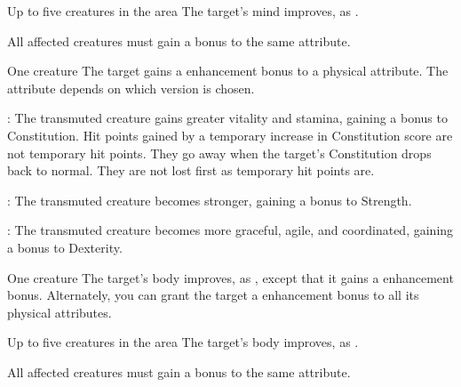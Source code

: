 \begin{spelltargets}{Up to five creatures in the area}
    \spelleffect The target's mind improves, as . 
\end{spelltargets}
\spellnotes All affected creatures must gain a bonus to the same attribute.

\spellrng{\rngtouch}
\spelldur{\durshort}
\begin{spelltarget}{One creature}
    \spelleffect The target gains a  enhancement bonus to a physical attribute. The attribute depends on which version is chosen.
    \par {}: The transmuted creature gains greater vitality and stamina, gaining a bonus to Constitution. Hit points gained by a temporary increase in Constitution score are not temporary hit points. They go away when the target's Constitution drops back to normal. They are not lost first as temporary hit points are.
    \par {}: The transmuted creature becomes stronger, gaining a bonus to Strength.
    \par {}: The transmuted creature becomes more graceful, agile, and coordinated, gaining a bonus to Dexterity.
\end{spelltarget}

\spellrng{\rngtouch}
\spelldur{\durshort}
\begin{spelltarget}{One creature}
    \spelleffect The target's body improves, as , except that it gains a  enhancement bonus. Alternately, you can grant the target a  enhancement bonus to all its physical attributes.
\end{spelltarget}

\begin{spelltargets}{Up to five creatures in the area}
    \spelleffect The target's body improves, as . 
\end{spelltargets}
\spellnotes All affected creatures must gain a bonus to the same attribute.

